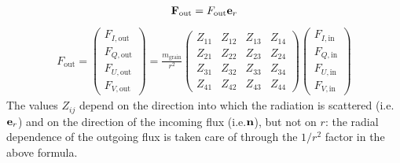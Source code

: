 \documentclass[letterpaper,10pt,english]{sphinxmanual}
\begin{document}
\begin{equation*}
\begin{split}{\bf F}_{\mathrm{out}} = F_{\mathrm{out}}{\bf e}_r\end{split}
\end{equation*}\begin{equation*}
\begin{split}F_{\mathrm{out}} = \left(\begin{matrix}
F_{I,\mathrm{out}}\\
F_{Q,\mathrm{out}}\\
F_{U,\mathrm{out}}\\
F_{V,\mathrm{out}}
\end{matrix}\right)
=\frac{m_{\mathrm{grain}}}{r^2}
\left(\begin{matrix}
Z_{11} & Z_{12} & Z_{13} & Z_{14} \\
Z_{21} & Z_{22} & Z_{23} & Z_{24} \\
Z_{31} & Z_{32} & Z_{33} & Z_{34} \\
Z_{41} & Z_{42} & Z_{43} & Z_{44}
\end{matrix}\right)
\left(\begin{matrix}
F_{I,\mathrm{in}}\\
F_{Q,\mathrm{in}}\\
F_{U,\mathrm{in}}\\
F_{V,\mathrm{in}}
\end{matrix}\right)\end{split}
\end{equation*}
The values \(Z_{ij}\) depend on the direction into which the radiation is
scattered (i.e.\({\bf e}_r\)) and on the direction of the incoming flux
(i.e.\({\bf n}\)), but not on \(r\): the radial dependence of the
outgoing flux is taken care of through the \(1/r^2\) factor in the above
formula.
\end{document}
